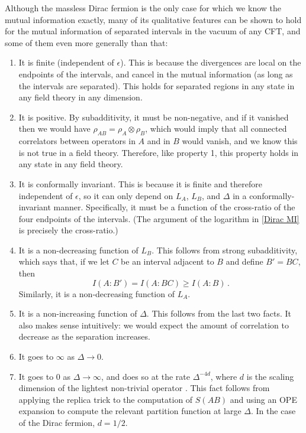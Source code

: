 \documentclass[11pt]{article}
\begin{document}
Although the massless Dirac fermion is the only case for which we know the mutual information exactly, many of its qualitative features can be shown to hold for the mutual information of separated intervals in the vacuum of any CFT, and some of them even more generally than that:
\begin{enumerate}
\item It is finite (independent of $\epsilon$). This is because the divergences are local on the endpoints of the intervals, and cancel in the mutual information (as long as the intervals are separated). This holds for separated regions in any state in any field theory in any dimension.
\item It is positive. By subadditivity, it must be non-negative, and if it vanished then we would have $\rho_{AB}=\rho_A\otimes\rho_B$, which would imply that all connected correlators between operators in $A$ and in $B$ would vanish, and we know this is not true in a field theory. Therefore, like property 1, this property holds in any state in any field theory.
\item It is conformally invariant. This is because it is finite and therefore independent of $\epsilon$, so it can only depend on $L_A$, $L_B$, and $\Delta$ in a conformally-invariant manner. Specifically, it must be a function of the cross-ratio of the four endpoints of the intervals. (The argument of the logarithm in \eqref{Dirac MI} is precisely the cross-ratio.)
\item It is a non-decreasing function of $L_B$. This follows from strong subadditivity, which says that, if we let $C$ be an interval adjacent to $B$ and define $B'=BC$, then  
\begin{equation}
I(A:B')=I(A:BC)\ge I(A:B)\,.
\end{equation}
Similarly, it is a non-decreasing function of $L_A$.
\item It is a non-increasing function of $\Delta$. This follows from the last two facts. It also makes sense intuitively: we would expect the amount of correlation to decrease as the separation increases.
\item It goes to $\infty$ as $\Delta\to0$.
\item It goes to 0 as $\Delta\to\infty$, and does so at the rate $\Delta^{-4d}$, where $d$ is the scaling dimension of the lightest non-trivial operator \cite{Calabrese:2010he}. This fact follows from applying the replica trick to the computation of $S(AB)$ and using an OPE expansion to compute the relevant partition function at large $\Delta$. In the case of the Dirac fermion, $d=1/2$.
\end{enumerate}
\end{document}
